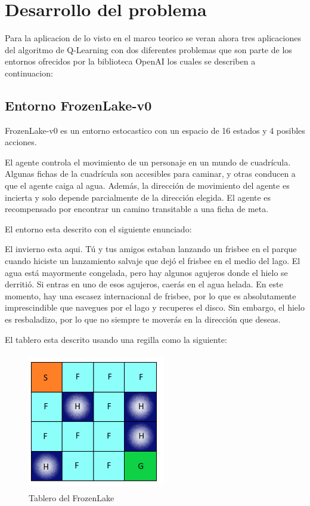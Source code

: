 \section{Desarrollo del problema}
Para la aplicacion de lo visto en el marco teorico se veran ahora tres aplicaciones del algoritmo de Q-Learning con dos diferentes problemas que son parte de los entornos ofrecidos por la biblioteca OpenAI los cuales se describen a continuacion:

\subsection{Entorno FrozenLake-v0}
FrozenLake-v0 es un entorno estocastico con un espacio de 16 estados y 4 posibles acciones.

El agente controla el movimiento de un personaje en un mundo de cuadrícula. Algunas fichas de la cuadrícula son accesibles para caminar, y otras conducen a que el agente caiga al agua. Además, la dirección de movimiento del agente es incierta y solo depende parcialmente de la dirección elegida. El agente es recompensado por encontrar un camino transitable a una ficha de meta.

El entorno esta descrito con el siguiente enunciado:

El invierno esta aqui. Tú y tus amigos estaban lanzando un frisbee en el parque cuando hiciste un lanzamiento salvaje que dejó el frisbee en el medio del lago. El agua está mayormente congelada, pero hay algunos agujeros donde el hielo se derritió. Si entras en uno de esos agujeros, caerás en el agua helada. En este momento, hay una escasez internacional de frisbee, por lo que es absolutamente imprescindible que navegues por el lago y recuperes el disco. Sin embargo, el hielo es resbaladizo, por lo que no siempre te moverás en la dirección que deseas.

El tablero esta descrito usando una regilla como la siguiente:

\begin{figure}[ht]
	\centering
	\includegraphics*[width=6cm,height=6cm,keepaspectratio]{figuras/Frozen-Lake} 
	\caption{Tablero del FrozenLake}
	\label{fig:Frozen-Lake}
\end{figure}

